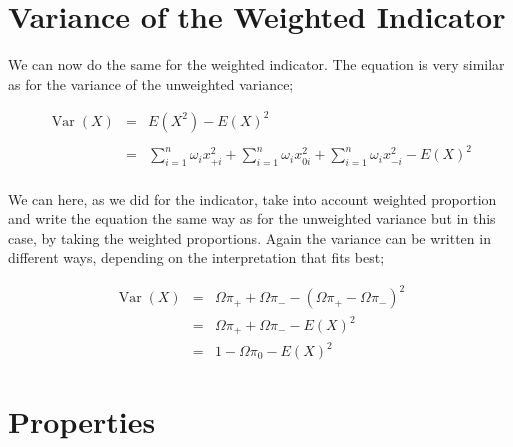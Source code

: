 \documentclass[12pt,a4paper,oneside]{book}
\DeclareMathOperator{\Var}{Var}
\begin{document}
\section{Variance of the Weighted Indicator}

We can now do the same for the weighted indicator. The equation is very similar as for the variance of the unweighted variance;



\begin{eqnarray}
\Var(X) &=&  E\left( X^2\right) - E\left( X\right)^2 \nonumber \\ \nonumber \\
    &=& \sum_{i=1}^n \omega_i x_{+i}^2 + \sum_{i=1}^n \omega_i x_{0i}^2  + \sum_{i=1}^n \omega_i x_{-i}^2 - E(X)^2 \nonumber \\
\end{eqnarray}

We can here, as we did for the indicator, take into account weighted proportion and write the equation the same way as for the unweighted variance but in this case, by taking the weighted proportions. Again the variance can be written in different ways, depending on the interpretation that fits best;

\begin{eqnarray}
\Var(X) &=& \Omega \pi_+ + \Omega \pi_- - ( \Omega \pi_+ - \Omega \pi_- )^2 \\
	&=& \Omega \pi_+ + \Omega \pi_- - E ( X )^2 \\
	&=& 1 - \Omega \pi_{0} - E(X)^2
\end{eqnarray}


\section{Properties}
\end{document}
